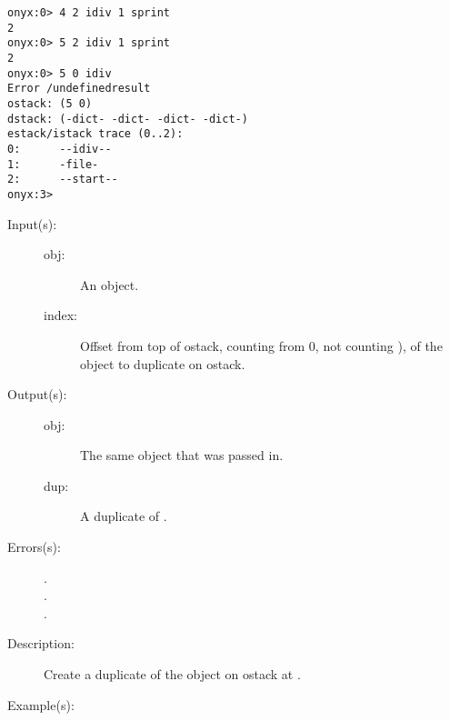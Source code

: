 \begin{description}
\begin{description}
\begin{verbatim}
onyx:0> 4 2 idiv 1 sprint
2
onyx:0> 5 2 idiv 1 sprint
2
onyx:0> 5 0 idiv
Error /undefinedresult
ostack: (5 0)
dstack: (-dict- -dict- -dict- -dict-)
estack/istack trace (0..2):
0:      --idiv--
1:      -file-
2:      --start--
onyx:3>
		\end{verbatim}
	\end{description}
\label{systemdict:idup}
\item[{\onyxop{obj \dots index}{idup}{obj \dots dup}}: ]
	\begin{description}\item[]
	\item[Input(s): ]
		\begin{description}\item[]
		\item[obj: ]
			An object.
		\item[index: ]
			Offset from top of ostack, counting from 0, not counting
			), of the object to duplicate on ostack.
		\end{description}
	\item[Output(s): ]
		\begin{description}\item[]
		\item[obj: ]
			The same object that was passed in.
		\item[dup: ]
			A duplicate of .
		\end{description}
	\item[Errors(s): ]
		\begin{description}\item[]
		\item[.]
		\item[.]
		\item[.]
		\end{description}
	\item[Description: ]
		Create a duplicate of the object on ostack at .
	\item[Example(s): ]\begin{verbatim}


\end{verbatim}
\end{description}
\end{description}
